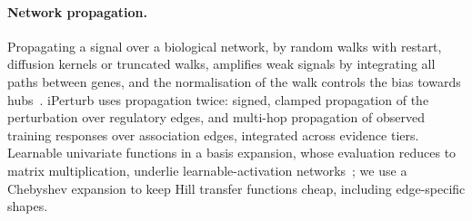 \paragraph{Network propagation.}
Propagating a signal over a biological network, by random walks with restart, diffusion kernels or truncated walks, amplifies weak signals by integrating all paths between genes, and the normalisation of the walk controls the bias towards hubs~\cite{cowen2017network}.
iPerturb uses propagation twice: signed, clamped propagation of the perturbation over regulatory edges, and multi-hop propagation of observed training responses over association edges, integrated across evidence tiers.
Learnable univariate functions in a basis expansion, whose evaluation reduces to matrix multiplication, underlie learnable-activation networks~\cite{liu2024kan,li2024fastkan}; we use a Chebyshev expansion to keep Hill transfer functions cheap, including edge-specific shapes.

